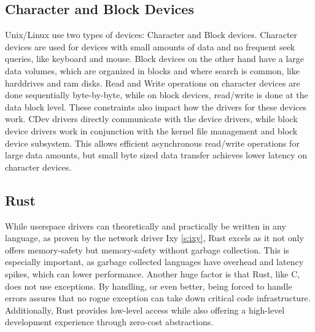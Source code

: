 \subsection{Character and Block Devices}
Unix/Linux use two types of devices: Character and Block devices. Character devices are used for devices with small amounts of data and no frequent seek queries, like keyboard and mouse. Block devices on the other hand have a large data volumes, which are organized in blocks and where search is common, like harddrives and ram disks.
Read and Write operations on character devices are done sequentially byte-by-byte, while on block devices, read/write is done at the data block level.
These constraints also impact how the drivers for these devices work. CDev drivers directly communicate with the device drivers, while block device drivers work in conjunction with the kernel file management and block device subsystem. This allows efficient asynchronous read/write operations for large data amounts, but small byte sized data transfer achieves lower latency on character devices.

\subsection{Rust}
While userspace drivers can theoretically and practically be written in any language, as proven by the network driver Ixy \autoref{s:ixy}, Rust excels as it not only offers memory-safety but memory-safety without garbage collection. This is especially important, as garbage collected languages have overhead and latency spikes, which can lower performance. Another huge factor is that Rust, like C, does not use exceptions. By handling, or even better, being forced to handle errors assures that no rogue exception can take down critical code infrastructure.
Additionally, Rust provides low-level access while also offering a high-level development experience through zero-cost abstractions.